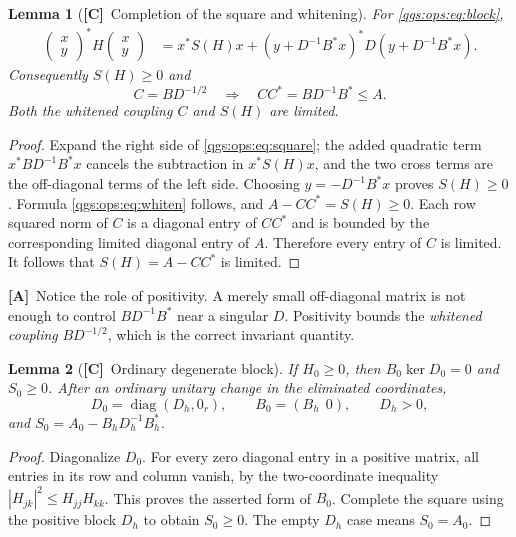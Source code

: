 \documentclass[11pt,oneside]{article}
\numberwithin{equation}{section}
\theoremstyle{plain}
\newtheorem{lemma}[lemma]{Lemma}
\theoremstyle{definition}
\theoremstyle{remark}
\DeclareMathOperator{\diag}{diag}
\newcommand{\abs}[1]{\left|#1\right|}
\newcommand{\TC}{\textcolor{TierC}{\textsf{\bfseries[C]}}}
\newcommand{\TA}{\textcolor{TierA}{\textsf{\bfseries[A]}}}
\begin{document}
\begin{lemma}[\TC\ Completion of the square and whitening]\label{qgs:ops:lem:schur}
For \eqref{qgs:ops:eq:block},
\begin{align}\label{qgs:ops:eq:square}
 \begin{pmatrix}x\\y\end{pmatrix}^*
 H\begin{pmatrix}x\\y\end{pmatrix}
 &=x^*S(H)x
 +(y+D^{-1}B^*x)^*D(y+D^{-1}B^*x).
\end{align}
Consequently $S(H)\ge0$ and
\begin{equation}\label{qgs:ops:eq:whiten}
 C=BD^{-1/2}\quad\Longrightarrow\quad
 CC^*=BD^{-1}B^*\le A.
\end{equation}
Both the whitened coupling $C$ and $S(H)$ are limited.
\end{lemma}
\begin{proof}
Expand the right side of \eqref{qgs:ops:eq:square}; the added quadratic term $x^*BD^{-1}B^*x$ cancels the subtraction in $x^*S(H)x$, and the two cross terms are the off-diagonal terms of the left side. Choosing $y=-D^{-1}B^*x$ proves $S(H)\ge0$. Formula \eqref{qgs:ops:eq:whiten} follows, and $A-CC^*=S(H)\ge0$. Each row squared norm of $C$ is a diagonal entry of $CC^*$ and is bounded by the corresponding limited diagonal entry of $A$. Therefore every entry of $C$ is limited. It follows that $S(H)=A-CC^*$ is limited.
\end{proof}

\TA\ Notice the role of positivity. A merely small off-diagonal matrix is not enough to control $BD^{-1}B^*$ near a singular $D$. Positivity bounds the \emph{whitened coupling} $BD^{-1/2}$, which is the correct invariant quantity.

\begin{lemma}[\TC\ Ordinary degenerate block]\label{qgs:ops:lem:ordinary-schur}
If $H_0\ge0$, then $B_0\ker D_0=0$ and $S_0\ge0$. After an ordinary unitary change in the eliminated coordinates,
\begin{equation}\label{qgs:ops:eq:ordinary-split}
 D_0=\diag(D_h,0_r),\qquad B_0=(B_h\ \ 0),\qquad D_h>0,
\end{equation}
and $S_0=A_0-B_hD_h^{-1}B_h^*$.
\end{lemma}
\begin{proof}
Diagonalize $D_0$. For every zero diagonal entry in a positive matrix, all entries in its row and column vanish, by the two-coordinate inequality $\abs{H_{jk}}^2\le H_{jj}H_{kk}$. This proves the asserted form of $B_0$. Complete the square using the positive block $D_h$ to obtain $S_0\ge0$. The empty $D_h$ case means $S_0=A_0$.
\end{proof}
\end{document}
